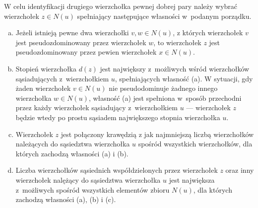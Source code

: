 {\begin{definition}
    W celu identyfikacji drugiego wierzchołka pewnej dobrej pary należy wybrać wierzchołek $z \in N(u)$ spełniający następujące własności w~podanym porządku.
    \begin{enumerate}[(a)]
      \item Jeżeli istnieją pewne dwa wierzchołki $v,w \in N(u)$, z których wierzchołek $v$ jest pseudozdominowany przez wierzchołek $w$, to wierzchołek $z$ jest pseudozdominowany przez pewien wierzchołek $x \in N(u)$.
      \item Stopień wierzchołka $d(z)$ jest największy z~możliwych wśród wierzchołków sąsiadujących z~wierzchołkiem $u$, spełniających własność (a).
      W sytuacji, gdy żaden wierzchołek $v \in N(u)$ nie pseudodominuje żadnego innego wierzchołka $w \in N(u)$, własność (a) jest spełniona w~sposób przechodni przez każdy wierzchołek sąsiadujący z~wierzchołkiem $u$ --- wierzchołek $z$ będzie wtedy po prostu sąsiadem największego stopnia wierzchołka $u$.
      \item Wierzchołek $z$ jest połączony krawędzią z jak najmniejszą liczbą wierzchołków należących do sąsiedztwa wierzchołka $u$ spośród wszystkich wierzchołków, dla których zachodzą własności (a) i (b).
      \item Liczba wierzchołków sąsiednich współdzielonych przez wierzchołek $z$ oraz inny wierzchołek nalężący do sąsiedztwa wierzchołka $u$ jest największa z~możliwych spośród wszystkich elementów zbioru $N(u)$, dla których zachodzą własności (a), (b) i (c).
    \end{enumerate}
  \end{definition}
}
